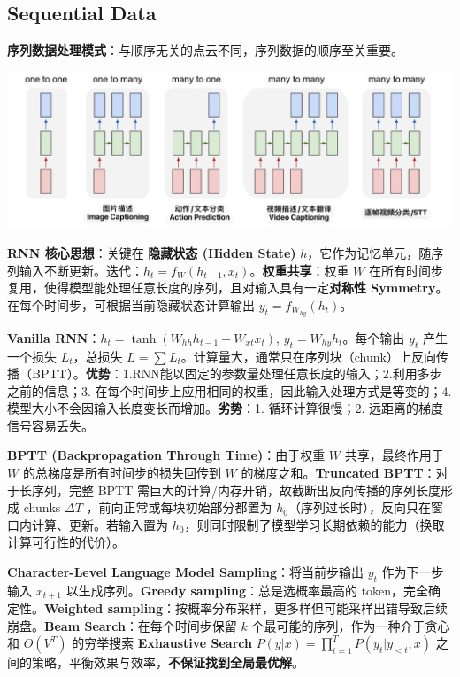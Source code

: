 \documentclass[
  8pt]{extarticle}
\begin{document}
\begin{multicols*}{4}
\hypertarget{sequential-data}{%
\section{Sequential Data}\label{sequential-data}}

\textbf{序列数据处理模式}：与顺序无关的点云不同，序列数据的顺序至关重要。

\includegraphics{./Cheatsheet-01-Sequential-Data.assets/image-20250617211140565.png}

\textbf{RNN 核心思想}：关键在 \textbf{隐藏状态 (Hidden State)}
\(h\)，它作为记忆单元，随序列输入不断更新。迭代：\(h_t = f_W(h_{t-1}, x_t)\)。\textbf{权重共享}：权重
\(W\)
在所有时间步复用，使得模型能处理任意长度的序列，且对输入具有一定\textbf{对称性
Symmetry}。在每个时间步，可根据当前隐藏状态计算输出
\(y_t = f_{W_{hy}}(h_t)\)。

\textbf{Vanilla RNN}：\(h_t=\tanh(W_{hh}h_{t-1}+W_{xt}x_t)\),
\(y_t=W_{hy}h_t\)。每个输出 \(y_t\) 产生一个损失 \(L_t\)，总损失
\(L=\sum L_t\)。计算量大，通常只在序列块（chunk）上反向传播（BPTT）。\textbf{优势}：1.RNN能以固定的参数量处理任意长度的输入；2.利用多步之前的信息；3.
在每个时间步上应用相同的权重，因此输入处理方式是等变的；4.模型大小不会因输入长度变长而增加。\textbf{劣势}：1.
循环计算很慢；2. 远距离的梯度信号容易丢失。

\textbf{BPTT (Backpropagation Through Time)}：由于权重 \(W\)
共享，最终作用于 \(W\) 的总梯度是所有时间步的损失回传到 \(W\)
的梯度之和。\textbf{Truncated BPTT}：对于长序列，完整 BPTT
需巨大的计算/内存开销，故截断出反向传播的序列长度形成 chunks
\(\Delta T\) ，前向正常或每块初始部分都置为
\(h_0\)（序列过长时），反向只在窗口内计算、更新。若输入置为
\(h_0\)，则同时限制了模型学习长期依赖的能力（换取计算可行性的代价）。

\textbf{Character-Level Language Model Sampling}：将当前步输出 \(y_t\)
作为下一步输入 \(x_{t+1}\) 以生成序列。\textbf{Greedy
sampling}：总是选概率最高的 token，完全确定性。\textbf{Weighted
sampling}：按概率分布采样，更多样但可能采样出错导致后续崩盘。\textbf{Beam
Search}：在每个时间步保留 \(k\) 个最可能的序列，作为一种介于贪心和
\(O(V^T)\) 的穷举搜索 \textbf{Exhaustive Search}
\(P(y|x) = \prod_{t=1}^{T} P(y_t | y_{<t}, x)\)
之间的策略，平衡效果与效率，\textbf{不保证找到全局最优解}。


\end{multicols*}
\end{document}

